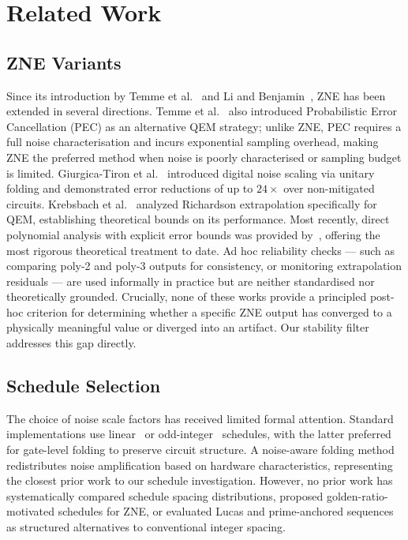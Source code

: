 \documentclass[10pt,letterpaper]{article}
\begin{document}
\section{Related Work}

\subsection{ZNE Variants}
Since its introduction by Temme et al.~\cite{Temme2017} and Li and
Benjamin~\cite{Li2017}, ZNE has been extended in several directions.
Temme et al.~\cite{Temme2017} also introduced Probabilistic Error
Cancellation (PEC) as an alternative QEM strategy; unlike ZNE, PEC
requires a full noise characterisation and incurs exponential sampling
overhead, making ZNE the preferred method when noise is poorly
characterised or sampling budget is limited.
Giurgica-Tiron et al.~\cite{GiurgicaTiron2020} introduced digital noise
scaling via unitary folding and demonstrated error reductions of up to
$24\times$ over non-mitigated circuits.
Krebsbach et al.~\cite{Krebsbach2022} analyzed Richardson extrapolation
specifically for QEM, establishing theoretical bounds on its performance.
Most recently, direct polynomial analysis with explicit error bounds was
provided by~\cite{Mohammadipour2025}, offering the most rigorous
theoretical treatment to date.
Ad hoc reliability checks --- such as comparing poly-2 and poly-3
outputs for consistency, or monitoring extrapolation residuals --- are
used informally in practice but are neither standardised nor
theoretically grounded.
Crucially, none of these works provide a principled post-hoc criterion
for determining whether a specific ZNE output has converged to a
physically meaningful value or diverged into an artifact.
Our stability filter addresses this gap directly.

\subsection{Schedule Selection}
The choice of noise scale factors has received limited formal attention.
Standard implementations use linear~\cite{Temme2017} or
odd-integer~\cite{LaRose2022} schedules, with the latter preferred for
gate-level folding to preserve circuit structure. A noise-aware folding
method~\cite{Hour2024} redistributes noise amplification based on
hardware characteristics, representing the closest prior work to our
schedule investigation. However, no prior work has systematically
compared schedule spacing distributions, proposed golden-ratio-motivated
schedules for ZNE, or evaluated Lucas and prime-anchored sequences as
structured alternatives to conventional integer spacing.
\end{document}
